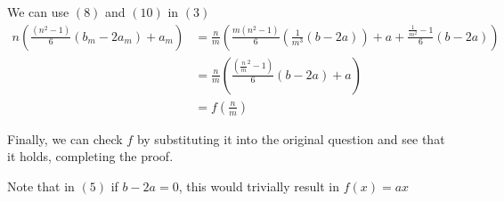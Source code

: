 \documentclass{article}
\begin{document}
\begin{enumerate}[1.]
We can use $(8)$ and $(10)$ in $(3)$
\begin{align}
 n(\frac{(n^2-1)}{6}(b_m-2a_m)+a_m) &= \frac{n}{m}(\frac{m(n^2-1)}{6}(\frac{1}{m^3}(b-2a))+a + \frac{\frac{1}{m^2}-1}{6}(b-2a))
\\ &= \frac{n}{m}(\frac{(\frac{n}{m}^2-1)}{6}(b-2a)+a)
\\ &= f(\frac{n}{m})
\end{align}

Finally, we can check $f$ by substituting it into the original question and see that it holds, completing the proof.

Note that in $(5)$ if $b-2a = 0$, this would trivially result in $f(x) = ax$

\end{enumerate}
\end{document}

